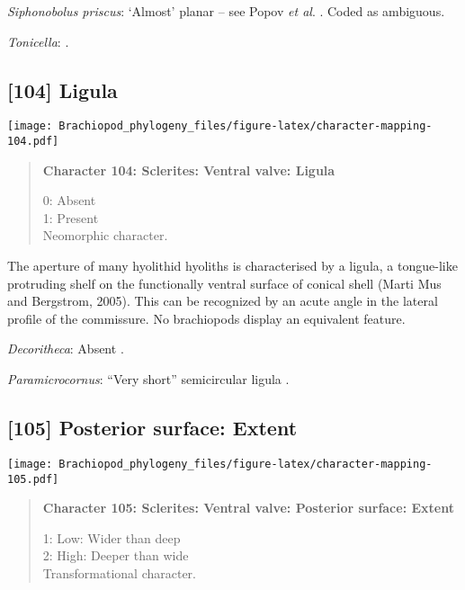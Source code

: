 \documentclass[openany]{book}
\theoremstyle{definition}
\theoremstyle{definition}
\theoremstyle{definition}
\theoremstyle{remark}
\begin{document}
\hypertarget{Siphonobolus_priscus-coding-103}{}
\emph{Siphonobolus priscus}: `Almost' planar -- see Popov \emph{et al}.
\citeyearpar[fig. 4]{Popov2009Earlyontogeny}. Coded as ambiguous.

\hypertarget{Tonicella-coding-103}{}
\emph{Tonicella}: \citep{Schwabe2010}.

\subsection*{{[}104{]} Ligula}\label{ligula}

\texttt{[image: Brachiopod\_phylogeny\_files/figure-latex/character-mapping-104.pdf]}

\begin{quote}
\textbf{Character 104: Sclerites: Ventral valve: Ligula}

0: Absent\\
1: Present\\
Neomorphic character.
\end{quote}

The aperture of many hyolithid hyoliths is characterised by a ligula, a
tongue-like protruding shelf on the functionally ventral surface of
conical shell (Marti Mus and Bergstrom, 2005). This can be recognized by
an acute angle in the lateral profile of the commissure. No brachiopods
display an equivalent feature.

\hypertarget{Decoritheca-coding-104}{}
\emph{Decoritheca}: Absent \citep{Malinky1987}.

\hypertarget{Paramicrocornus-coding-104}{}
\emph{Paramicrocornus}: ``Very short'' semicircular ligula
\citep{Zhang2018Ahyolithid}.

\subsection*{{[}105{]} Posterior surface:
Extent}\label{posterior-surface-extent}

\texttt{[image: Brachiopod\_phylogeny\_files/figure-latex/character-mapping-105.pdf]}

\begin{quote}
\textbf{Character 105: Sclerites: Ventral valve: Posterior surface:
Extent}

1: Low: Wider than deep\\
2: High: Deeper than wide\\
Transformational character.
\end{quote}
\end{document}
